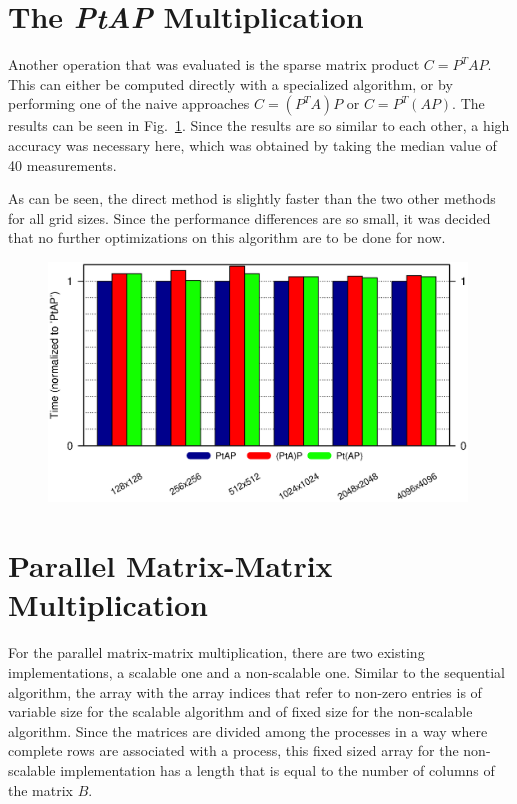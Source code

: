 \section{The \textit{PtAP} Multiplication}
Another operation that was evaluated is the sparse matrix product $C = P^T A P$. This can either be computed directly with a specialized algorithm, or by performing one of the naive approaches $C = (P^T A) P$ or $C = P^T (A P)$. The results can be seen in Fig.~\ref{fig:ex2_ptap}. Since the results are so similar to each other, a high accuracy was necessary here, which was obtained by taking the median value of 40 measurements.

As can be seen, the direct method is slightly faster than the two other methods for all grid sizes. 	Since the performance differences are so small, it was decided that no further optimizations on this algorithm are to be done for now.

\begin{figure}[tbp]
	\centering
	\includegraphics[width=0.99\textwidth,  trim={0 2.cm 0 6cm},clip]{ex2_PtAP}
	\caption{} 
	\label{fig:ex2_ptap}
\end{figure}

\section{Parallel Matrix-Matrix Multiplication}
For the parallel matrix-matrix multiplication, there are two existing implementations, a scalable one and a non-scalable one. Similar to the sequential algorithm, the array with the array indices that refer to non-zero entries is of variable size for the scalable algorithm and of fixed size for the non-scalable algorithm. Since the matrices are divided among the processes in a way where complete rows are  associated with a process, this fixed sized array for the non-scalable implementation has a length that is equal to the number of columns of the matrix $B$. 

